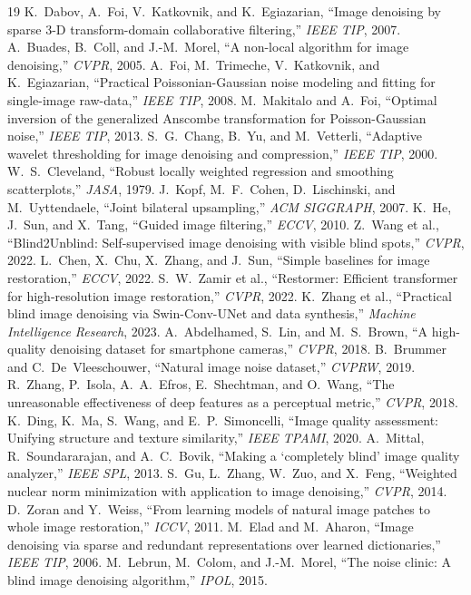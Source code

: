 \documentclass[10pt,twocolumn]{article}
\begin{document}
\begin{thebibliography}{19}\small
{} K.~Dabov, A.~Foi, V.~Katkovnik, and K.~Egiazarian, ``Image
denoising by sparse 3-D transform-domain collaborative filtering,'' \emph{IEEE
TIP}, 2007.
 A.~Buades, B.~Coll, and J.-M.~Morel, ``A non-local algorithm for
image denoising,'' \emph{CVPR}, 2005.
 A.~Foi, M.~Trimeche, V.~Katkovnik, and K.~Egiazarian,
``Practical Poissonian-Gaussian noise modeling and fitting for single-image
raw-data,'' \emph{IEEE TIP}, 2008.
 M.~Makitalo and A.~Foi, ``Optimal inversion of the
generalized Anscombe transformation for Poisson-Gaussian noise,'' \emph{IEEE
TIP}, 2013.
 S.~G.~Chang, B.~Yu, and M.~Vetterli, ``Adaptive wavelet
thresholding for image denoising and compression,'' \emph{IEEE TIP}, 2000.
 W.~S.~Cleveland, ``Robust locally weighted regression and
smoothing scatterplots,'' \emph{JASA}, 1979.
 J.~Kopf, M.~F.~Cohen, D.~Lischinski, and M.~Uyttendaele,
``Joint bilateral upsampling,'' \emph{ACM SIGGRAPH}, 2007.
 K.~He, J.~Sun, and X.~Tang, ``Guided image filtering,''
\emph{ECCV}, 2010.
 Z.~Wang et al., ``Blind2Unblind: Self-supervised image denoising
with visible blind spots,'' \emph{CVPR}, 2022.
 L.~Chen, X.~Chu, X.~Zhang, and J.~Sun, ``Simple baselines for
image restoration,'' \emph{ECCV}, 2022.
 S.~W.~Zamir et al., ``Restormer: Efficient transformer for
high-resolution image restoration,'' \emph{CVPR}, 2022.
 K.~Zhang et al., ``Practical blind image denoising via
Swin-Conv-UNet and data synthesis,'' \emph{Machine Intelligence Research},
2023.
 A.~Abdelhamed, S.~Lin, and M.~S.~Brown, ``A high-quality
denoising dataset for smartphone cameras,'' \emph{CVPR}, 2018.
 B.~Brummer and C.~De~Vleeschouwer, ``Natural image noise
dataset,'' \emph{CVPRW}, 2019.
 R.~Zhang, P.~Isola, A.~A.~Efros, E.~Shechtman, and O.~Wang,
``The unreasonable effectiveness of deep features as a perceptual metric,''
\emph{CVPR}, 2018.
 K.~Ding, K.~Ma, S.~Wang, and E.~P.~Simoncelli, ``Image quality
assessment: Unifying structure and texture similarity,'' \emph{IEEE TPAMI},
2020.
 A.~Mittal, R.~Soundararajan, and A.~C.~Bovik, ``Making a
`completely blind' image quality analyzer,'' \emph{IEEE SPL}, 2013.
 S.~Gu, L.~Zhang, W.~Zuo, and X.~Feng, ``Weighted nuclear norm
minimization with application to image denoising,'' \emph{CVPR}, 2014.
 D.~Zoran and Y.~Weiss, ``From learning models of natural image
patches to whole image restoration,'' \emph{ICCV}, 2011.
 M.~Elad and M.~Aharon, ``Image denoising via sparse and
redundant representations over learned dictionaries,'' \emph{IEEE TIP}, 2006.
 M.~Lebrun, M.~Colom, and J.-M.~Morel, ``The noise
clinic: A blind image denoising algorithm,'' \emph{IPOL}, 2015.
\end{thebibliography}
\end{document}
